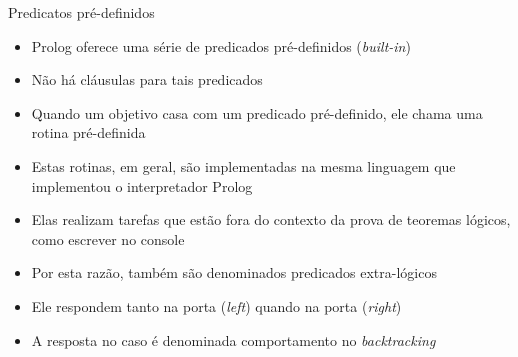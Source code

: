 \begin{frame}[fragile]{Predicatos pré-definidos}

    \begin{itemize}
        \item Prolog oferece uma série de predicados pré-definidos (\textit{built-in})

        \item Não há cláusulas para tais predicados

        \item Quando um objetivo casa com um predicado pré-definido, ele chama uma rotina 
            pré-definida

        \item Estas rotinas, em geral, são implementadas na mesma linguagem que implementou o 
            interpretador Prolog 

        \item Elas realizam tarefas que estão fora do contexto da prova de teoremas lógicos, 
            como escrever no console 

        \item Por esta razão, também são denominados predicados extra-lógicos 

        \item Ele respondem tanto na porta  (\textit{left}) quando na 
            porta  (\textit{right})

        \item A resposta no caso  é denominada comportamento no 
            \textit{backtracking}

    \end{itemize}

\end{frame}

